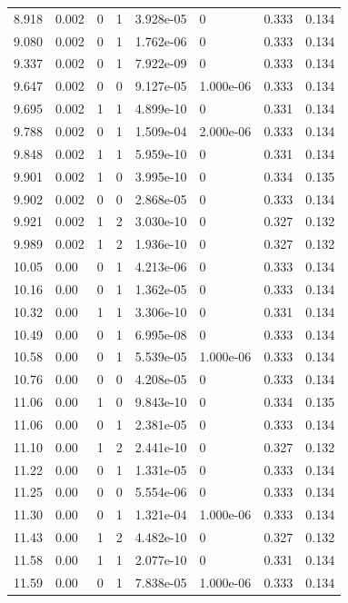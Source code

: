 \documentclass[preview]{standalone}
\begin{document}
{{{\begin{tabular}{L{1.2cm}C{1.2cm} C{0.3cm}C{0.5cm} C{1.4cm}C{1.4cm} C{1.4cm}C{1.4cm}}
  8.918  &  0.002  & 0     &  1 &  3.928e-05  & 0  & 0.333 &  0.134   \\ 
  9.080  &  0.002  & 0     &  1 &  1.762e-06  & 0  & 0.333 &  0.134   \\ 
  9.337  &  0.002  & 0     &  1 &  7.922e-09  & 0  & 0.333 &  0.134   \\ 
  9.647  &  0.002  & 0     &  0 &  9.127e-05  & 1.000e-06  & 0.333 &  0.134   \\ 
  9.695  &  0.002  & 1     &  1 &  4.899e-10  & 0  & 0.331 &  0.134   \\ 
  9.788  &  0.002  & 0     &  1 &  1.509e-04  & 2.000e-06  & 0.333 &  0.134   \\ 
  9.848  &  0.002  & 1     &  1 &  5.959e-10  & 0  & 0.331 &  0.134   \\ 
  9.901  &  0.002  & 1     &  0 &  3.995e-10  & 0  & 0.334 &  0.135   \\ 
  9.902  &  0.002  & 0     &  0 &  2.868e-05  & 0  & 0.333 &  0.134   \\ 
  9.921  &  0.002  & 1     &  2 &  3.030e-10  & 0  & 0.327 &  0.132   \\ 
  9.989  &  0.002  & 1     &  2 &  1.936e-10  & 0  & 0.327 &  0.132   \\ 
  10.05  &  0.00  & 0     &  1 &  4.213e-06  & 0  & 0.333 &  0.134   \\ 
  10.16  &  0.00  & 0     &  1 &  1.362e-05  & 0  & 0.333 &  0.134   \\ 
  10.32  &  0.00  & 1     &  1 &  3.306e-10  & 0  & 0.331 &  0.134   \\ 
  10.49  &  0.00  & 0     &  1 &  6.995e-08  & 0  & 0.333 &  0.134   \\ 
  10.58  &  0.00  & 0     &  1 &  5.539e-05  & 1.000e-06  & 0.333 &  0.134   \\ 
  10.76  &  0.00  & 0     &  0 &  4.208e-05  & 0  & 0.333 &  0.134   \\ 
  11.06  &  0.00  & 1     &  0 &  9.843e-10  & 0  & 0.334 &  0.135   \\ 
  11.06  &  0.00  & 0     &  1 &  2.381e-05  & 0  & 0.333 &  0.134   \\ 
  11.10  &  0.00  & 1     &  2 &  2.441e-10  & 0  & 0.327 &  0.132   \\ 
  11.22  &  0.00  & 0     &  1 &  1.331e-05  & 0  & 0.333 &  0.134   \\ 
  11.25  &  0.00  & 0     &  0 &  5.554e-06  & 0  & 0.333 &  0.134   \\ 
  11.30  &  0.00  & 0     &  1 &  1.321e-04  & 1.000e-06  & 0.333 &  0.134   \\ 
  11.43  &  0.00  & 1     &  2 &  4.482e-10  & 0  & 0.327 &  0.132   \\ 
  11.58  &  0.00  & 1     &  1 &  2.077e-10  & 0  & 0.331 &  0.134   \\ 
  11.59  &  0.00  & 0     &  1 &  7.838e-05  & 1.000e-06  & 0.333 &  0.134   \\ 
\hline 
\end{tabular} 

}}}
\end{document}
